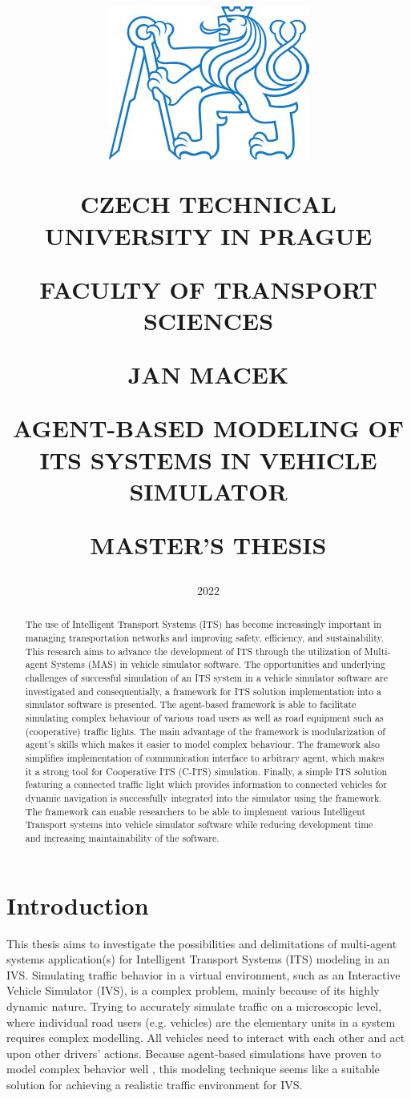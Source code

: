 \documentclass[titlepage, 12pt]{article}
\title{
\includegraphics[width=.3\textwidth]{cvut-logo.jpg}\par
\vspace{10mm}
\indent
\textbf{CZECH TECHNICAL UNIVERSITY IN PRAGUE}

FACULTY OF TRANSPORT SCIENCES

\vfill

{\Large JAN MACEK}
\vspace{10mm}

AGENT-BASED MODELING OF ITS SYSTEMS IN VEHICLE SIMULATOR 
\vspace{15mm}

{\Large MASTER'S THESIS}
\vfill

}
\date{\Large 2022}
\begin{document}
\setlength{\baselineskip}{1.5em}
\maketitle



\begin{abstract}
    The use of Intelligent Transport Systems (ITS) has become increasingly important in
    managing transportation networks and improving safety, efficiency, and sustainability. This
    research aims to advance the development of ITS through the utilization of Multi-agent
    Systems (MAS) in vehicle simulator software. The opportunities and underlying challenges of
    successful  simulation of an ITS system in a vehicle simulator software are investigated
    and consequentially, a framework for ITS solution implementation into a simulator software
    is presented. The agent-based framework is able to facilitate simulating complex behaviour
    of various road users as well as road equipment such as (cooperative) traffic lights. The
    main advantage of the framework is modularization of agent's skills which makes it easier
    to model complex behaviour. The framework also simplifies implementation of communication
    interface to arbitrary agent, which makes it a strong tool for Cooperative ITS (C-ITS)
    simulation. Finally, a simple ITS solution featuring a connected traffic light which
    provides information to connected vehicles for dynamic navigation is successfully
    integrated into the simulator using the framework. The framework can enable researchers to
    be able to implement various Intelligent Transport systems into vehicle simulator software
    while reducing development time and increasing maintainability of the software.
    \end{abstract}

\tableofcontents
\listoftables
\listoffigures
\newpage

\section{Introduction}

This thesis aims to investigate the possibilities and delimitations of multi-agent systems
application(s) for Intelligent Transport Systems (ITS) modeling in an IVS. Simulating traffic
behavior in a virtual environment, such as an Interactive Vehicle Simulator (IVS), is a complex
problem, mainly because of its highly dynamic nature. Trying to accurately simulate traffic on
a microscopic level, where individual road users (e.g. vehicles) are the elementary units in a
system requires complex modelling. All vehicles need to interact with each other and act upon
other drivers' actions. Because agent-based simulations have proven to model complex behavior
well \cite{Shoham}, this modeling technique seems like a suitable solution for achieving a realistic traffic
environment for IVS. 
\end{document}

